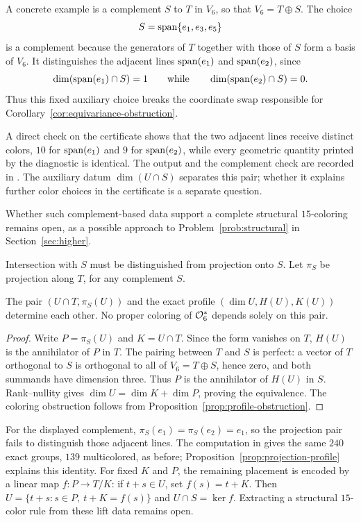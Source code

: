 A concrete example is a complement \(S\) to \(T\) in \(V_6\), so that
\(V_6 = T \oplus S\).  The choice
\[
S = \operatorname{span}\{e_1, e_3, e_5\}
\]
is a complement because the generators of \(T\) together with those
of \(S\) form a basis of \(V_6\).  It distinguishes the adjacent
lines \(\operatorname{span}(e_1)\) and \(\operatorname{span}(e_2)\),
since
\[
\dim(\operatorname{span}(e_1) \cap S) = 1
\qquad\text{while}\qquad
\dim(\operatorname{span}(e_2) \cap S) = 0.
\]
Thus this fixed auxiliary choice breaks the coordinate swap
responsible for Corollary~\ref{cor:equivariance-obstruction}.

A direct check on the certificate shows that the two adjacent lines
receive distinct colors, \(10\) for \(\operatorname{span}(e_1)\) and \(9\) for
\(\operatorname{span}(e_2)\), while every geometric quantity printed by
the diagnostic  is identical.
The output and the complement check are recorded in
.  The auxiliary datum
\(\dim(U\cap S)\) separates this pair; whether it explains further
color choices in the certificate is a separate question.

Whether such complement-based data support a complete structural
\(15\)-coloring remains open, as a possible approach to
Problem~\ref{prob:structural} in Section~\ref{sec:higher}.

Intersection with \(S\) must be distinguished from projection onto \(S\).
Let \(\pi_S\) be projection along \(T\), for any complement \(S\).
\begin{proposition}\label{prop:projection-profile}
The pair \((U\cap T,\pi_S(U))\) and the exact profile
\((\dim U,H(U),K(U))\) determine each other.  No proper coloring
of \(\mathcal O_6^*\) depends solely on this pair.
\end{proposition}
\begin{proof}
Write \(P=\pi_S(U)\) and \(K=U\cap T\).  Since the form vanishes
on \(T\), \(H(U)\) is the annihilator of \(P\) in \(T\).
The pairing between \(T\) and \(S\) is perfect: a vector of \(T\)
orthogonal to \(S\) is orthogonal to all of \(V_6=T\oplus S\),
hence zero, and both summands have dimension three.  Thus \(P\) is
the annihilator of \(H(U)\) in \(S\).  Rank--nullity gives
\(\dim U=\dim K+\dim P\), proving the equivalence.  The coloring
obstruction follows from Proposition~\ref{prop:profile-obstruction}.
\end{proof}

For the displayed complement, \(\pi_S(e_1)=\pi_S(e_2)=e_1\),
so the projection pair fails to distinguish those adjacent lines.
The computation in  gives the
same \(240\) exact groups, \(139\) multicolored, as before;
Proposition~\ref{prop:projection-profile} explains this identity.
For fixed \(K\) and \(P\), the remaining placement is encoded by a
linear map \(f:P\to T/K\): if \(t+s\in U\), set \(f(s)=t+K\).
Then \(U=\{t+s:s\in P,\ t+K=f(s)\}\) and
\(U\cap S=\ker f\).  Extracting a structural \(15\)-color rule
from these lift data remains open.

